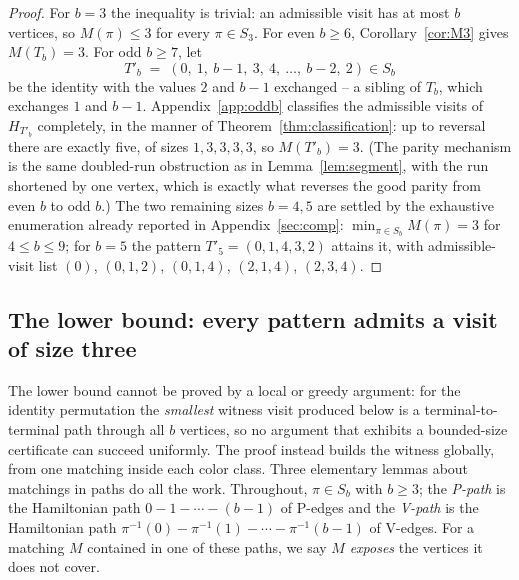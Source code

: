 \documentclass[11pt]{article}
\theoremstyle{definition}
\newcommand{\inv}[1]{#1^{-1}}
\begin{document}
\begin{proof}
For $b = 3$ the inequality is trivial: an admissible visit has at most $b$ vertices,
so $M(\pi) \le 3$ for every $\pi \in S_3$. For even $b \ge 6$,
Corollary~\ref{cor:M3} gives $M(T_b) = 3$. For odd $b \ge 7$, let
\[
  T'_b \;=\; (0,\ 1,\ b{-}1,\ 3,\ 4,\ \dots,\ b{-}2,\ 2) \in S_b
\]
be the identity with the values $2$ and $b-1$ exchanged -- a sibling of $T_b$, which
exchanges $1$ and $b-1$. Appendix~\ref{app:oddb} classifies the admissible visits of
$H_{T'_b}$ completely, in the manner of Theorem~\ref{thm:classification}: up to
reversal there are exactly five, of sizes $1, 3, 3, 3, 3$, so $M(T'_b) = 3$. (The
parity mechanism is the same doubled-run obstruction as in
Lemma~\ref{lem:segment}, with the run shortened by one vertex, which is exactly what
reverses the good parity from even $b$ to odd $b$.) The two remaining sizes $b = 4, 5$
are settled by the exhaustive enumeration already reported in
Appendix~\ref{sec:comp}: $\min_{\pi \in S_b} M(\pi) = 3$ for $4 \le b \le 9$; for $b=5$
the pattern $T'_5 = (0,1,4,3,2)$ attains it, with admissible-visit list
$(0)$, $(0,1,2)$, $(0,1,4)$, $(2,1,4)$, $(2,3,4)$.
\end{proof}

\subsection{The lower bound: every pattern admits a visit of size three}

The lower bound cannot be proved by a local or greedy argument: for the identity
permutation the \emph{smallest} witness visit produced below is a
terminal-to-terminal path through all $b$ vertices, so no argument that exhibits a
bounded-size certificate can succeed uniformly. The proof instead builds the witness
globally, from one matching inside each color class. Three elementary lemmas about
matchings in paths do all the work. Throughout, $\pi \in S_b$ with $b \ge 3$; the
\emph{P-path} is the Hamiltonian path $0 - 1 - \cdots - (b-1)$ of P-edges and the
\emph{V-path} is the Hamiltonian path $\inv\pi(0) - \inv\pi(1) - \cdots - \inv\pi(b-1)$
of V-edges. For a matching $M$ contained in one of these paths, we say $M$
\emph{exposes} the vertices it does not cover.
\end{document}
